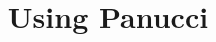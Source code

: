 \documentclass{article}
\begin{document}
\title{Using Panucci}
\maketitle
\begin{flushleft}
\end{flushleft}
\end{document}
